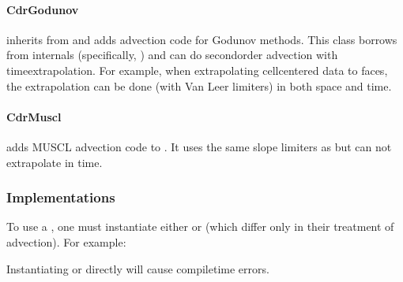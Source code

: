 \documentclass[letterpaper,10pt,english]{sphinxmanual}
\begin{document}
\paragraph{CdrGodunov}
\label{\detokenize{Solvers/CDR:cdrgodunov}}
\sphinxAtStartPar
{} inherits from  and adds advection code for Godunov methods.
This class borrows from  internals (specifically, ) and can do second\sphinxhyphen{}order advection with time\sphinxhyphen{}extrapolation.
For example, when extrapolating cell\sphinxhyphen{}centered data to faces, the extrapolation can be done (with Van Leer limiters) in both space and time.


\paragraph{CdrMuscl}
\label{\detokenize{Solvers/CDR:cdrmuscl}}
\sphinxAtStartPar
{} adds MUSCL advection code to .
It uses the same slope limiters as  but can not extrapolate in time.


\subsubsection{Implementations}
\label{\detokenize{Solvers/CDR:implementations}}
\sphinxAtStartPar
To use a , one must instantiate either  or  (which differ only in their treatment of advection).
For example:

\begin{sphinxVerbatim}[commandchars=\\\{\},formatcom=\scriptsize]
     
      

\end{sphinxVerbatim}

\sphinxAtStartPar
Instantiating  or  directly will cause compile\sphinxhyphen{}time errors.
\end{document}
